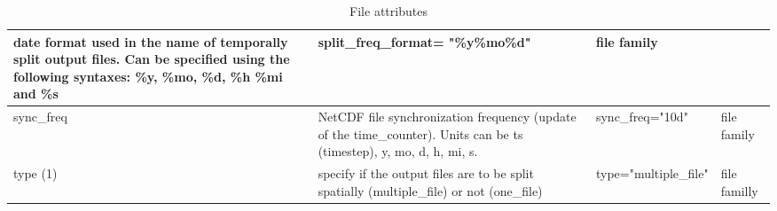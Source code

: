 \documentclass[../main/NEMO_manual]{subfiles}
\begin{document}
\begin{table}
\begin{tabularx}{\textwidth}{|l|X|l|l|}
    date format used in the name of temporally split output files.
    Can be specified using the following syntaxes: \%y, \%mo, \%d, \%h \%mi and \%s                      &
    split\_freq\_format= "\%y\%mo\%d"                                                                    &
    file family                            \\
    \hline
    sync\_freq                                                                                           &
    NetCDF file synchronization frequency (update of the time\_counter).
    Units can be ts (timestep), y, mo, d, h, mi, s.                                                      &
    sync\_freq="10d"                                                                                     &
    file family                            \\
    \hline
    type (1)                                                                                             &
    specify if the output files are to be split spatially (multiple\_file) or not (one\_file)            &
    type="multiple\_file"                                                                                &
    file familly                           \\
    \hline
  \end{tabularx}
  \caption{File attributes}
\end{table}
\end{document}
